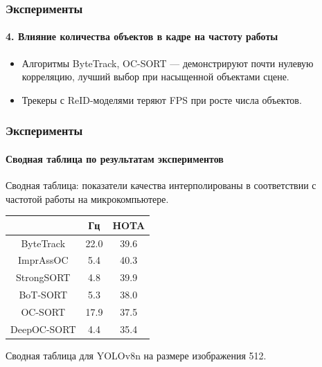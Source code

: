 \documentclass{beamer} %
\begin{document}
\begin{frame}
  \frametitle{Эксперименты}
  \framesubtitle{4. Влияние количества объектов в кадре на частоту работы}
  
  \begin{itemize}
    \item Алгоритмы ByteTrack, OC-SORT — демонстрируют почти нулевую корреляцию, лучший выбор при насыщенной объектами сцене.
    \item Трекеры с ReID-моделями теряют FPS при росте числа объектов.
  \end{itemize}

\end{frame}

\begin{frame}
  \frametitle{Эксперименты}
  \framesubtitle{Сводная таблица по результатам экспериментов}
  Сводная таблица: показатели качества интерполированы в соответствии с частотой работы на микрокомпьютере. 

  \centering
  \large{
  \begin{center}
    \begin{tabular}{ c|c|c } 
     \hline
      & Гц & HOTA \\ 
      \hline
    ByteTrack & 22.0 & 39.6\\
    ImprAssOC & 5.4 & 40.3\\
    StrongSORT & 4.8 & 39.9\\
    BoT-SORT & 5.3 & 38.0\\
    OC-SORT & 17.9 & 37.5\\
    DeepOC-SORT & 4.4 & 35.4\\
     \hline
    \end{tabular}
  \end{center}
  }
  \small Сводная таблица для YOLOv8n на размере изображения 512.
\end{frame}
\end{document}
